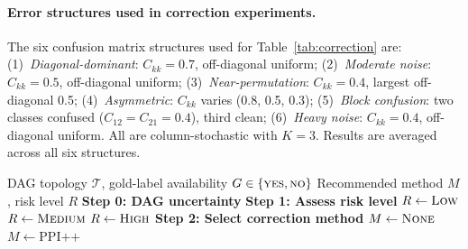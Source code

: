 \paragraph{Error structures used in correction experiments.}
The six confusion matrix structures used for Table~\ref{tab:correction} are:
(1)~\emph{Diagonal-dominant}: $C_{kk}{=}0.7$, off-diagonal uniform;
(2)~\emph{Moderate noise}: $C_{kk}{=}0.5$, off-diagonal uniform;
(3)~\emph{Near-permutation}: $C_{kk}{=}0.4$, largest off-diagonal 0.5;
(4)~\emph{Asymmetric}: $C_{kk}$ varies (0.8, 0.5, 0.3);
(5)~\emph{Block confusion}: two classes confused ($C_{12}{=}C_{21}{=}0.4$), third clean;
(6)~\emph{Heavy noise}: $C_{kk}{=}0.4$, off-diagonal uniform.
All are column-stochastic with $K{=}3$. Results are averaged across all six structures.

\begin{algorithm}[h]
\caption{Correction method selection for LLM-annotated causal inference. This topology-based classification is robust to $\varepsilon$-approximate deviations; practitioners computing quantitative ASV thresholds should note the $\varepsilon$-approximate bounds (Conjecture~\ref{conj:monotone}, Section~\ref{sec:asv}). Assumes linear structural equations; FWL-based routing may not apply under nonlinear models (see Appendix~\ref{sec:logistic_dgp}). Thresholds calibrated for $K{=}3$ linear SEM; recalibrate for different $K$ using topology-specific bias functions.}
\label{alg:correction}
\small
\begin{algorithmic}[1]
\REQUIRE DAG topology $\mathcal{T}$, gold-label availability $G \in \{\textsc{yes}, \textsc{no}\}$
\ENSURE Recommended method $M$, risk level $R$
\STATE
\STATE \textbf{Step 0: DAG uncertainty} 
\STATE
\STATE \textbf{Step 1: Assess risk level}
    \STATE $R \gets \textsc{Low}$ 
    \STATE $R \gets \textsc{Medium}$ 
\ELSE
    \STATE $R \gets \textsc{High}$ 
\ENDIF
\STATE
\STATE \textbf{Step 2: Select correction method}
        \STATE $M \gets \textsc{None}$ 
    \ELSE
        \STATE $M \gets \text{PPI++}$ 
    \ENDIF

\end{algorithmic}
\end{algorithm}
